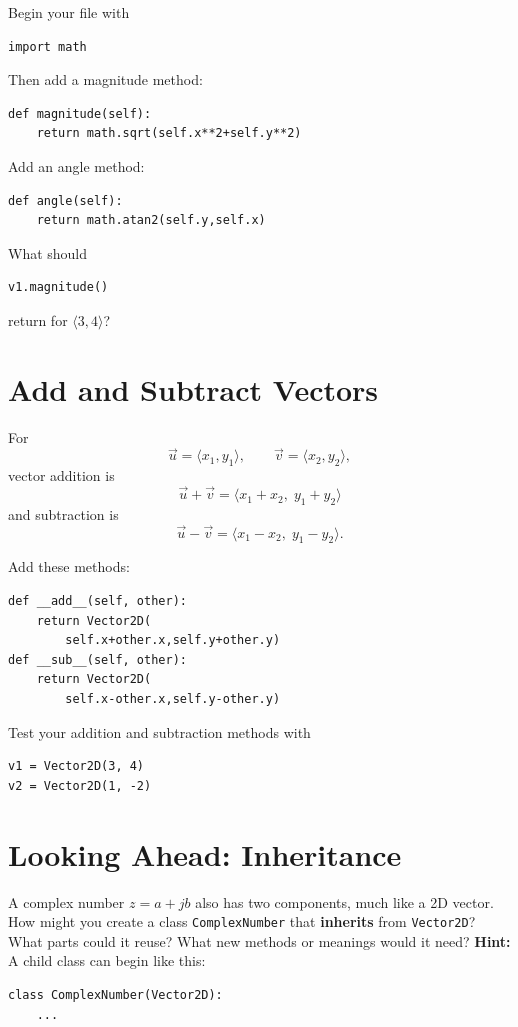 \documentclass[11pt]{article}
\begin{document}
Begin your file with
\begin{verbatim}
import math
\end{verbatim}

Then add a magnitude method:

\begin{verbatim}
def magnitude(self):
    return math.sqrt(self.x**2+self.y**2)
\end{verbatim}

Add an angle method:

\begin{verbatim}
def angle(self):
    return math.atan2(self.y,self.x)
\end{verbatim}

What should
\begin{verbatim}
v1.magnitude()
\end{verbatim}
return for \(\langle 3,4\rangle\)?
\underline{\hspace{1.3cm}}

\section{Add and Subtract Vectors}

For
\[
\vec{u}=\langle x_1,y_1\rangle,
\qquad
\vec{v}=\langle x_2,y_2\rangle,
\]
vector addition is
\[
\vec{u}+\vec{v}
=
\langle x_1+x_2,\; y_1+y_2\rangle
\]
and subtraction is
\[
\vec{u}-\vec{v}
=
\langle x_1-x_2,\; y_1-y_2\rangle.
\]

Add these methods:

\begin{verbatim}
def __add__(self, other):
    return Vector2D(
        self.x+other.x,self.y+other.y)
def __sub__(self, other):
    return Vector2D(
        self.x-other.x,self.y-other.y)
\end{verbatim}

Test your addition and subtraction methods with
\begin{verbatim}
v1 = Vector2D(3, 4)
v2 = Vector2D(1, -2)
\end{verbatim}

\section{Looking Ahead: Inheritance}

A complex number $z = a + jb$ also has two components, much like a 2D vector.  How might you create a class
\texttt{ComplexNumber} that \textbf{inherits} from \texttt{Vector2D}?  What parts could it reuse? What new methods or meanings would it need? \textbf{Hint:} A child class can begin like this:
\begin{verbatim}
class ComplexNumber(Vector2D):
    ...
\end{verbatim}
\end{document}
